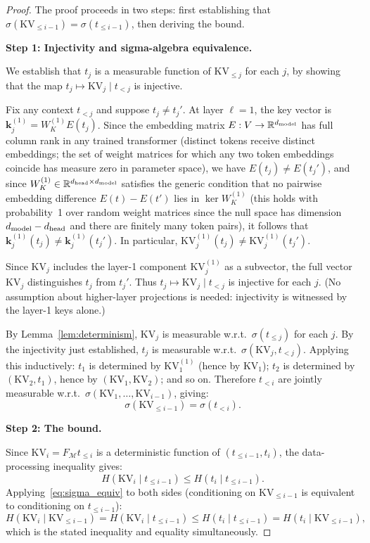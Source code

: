 \documentclass[11pt]{article}
\begin{document}
\begin{proof}
The proof proceeds in two steps: first establishing that $\sigma(\mathrm{KV}_{\leq i-1}) = \sigma(t_{\leq i-1})$, then deriving the bound.

\textbf{Step 1: Injectivity and sigma-algebra equivalence.}

We establish that $t_j$ is a measurable function of $\mathrm{KV}_{\leq j}$ for
each $j$, by showing that the map $t_j \mapsto \mathrm{KV}_j \mid t_{<j}$ is
injective.

Fix any context $t_{<j}$ and suppose $t_j \neq t_j'$.  At layer $\ell = 1$,
the key vector is $\mathbf{k}^{(1)}_j = W_K^{(1)} E(t_j)$.  Since the
embedding matrix $E: V \to \mathbb{R}^{d_{\rm model}}$ has full column rank
in any trained transformer (distinct tokens receive distinct embeddings; the
set of weight matrices for which any two token embeddings coincide has measure
zero in parameter space), we have $E(t_j) \neq E(t_j')$, and since
$W_K^{(1)} \in \mathbb{R}^{d_{\rm head} \times d_{\rm model}}$ satisfies the generic condition that no pairwise embedding difference $E(t) - E(t')$ lies in $\ker W_K^{(1)}$ (this holds with probability~1 over random weight matrices since the null space has dimension $d_{\rm model} - d_{\rm head}$ and there are finitely many token pairs), it follows that
$\mathbf{k}^{(1)}_j(t_j) \neq \mathbf{k}^{(1)}_j(t_j')$.  In particular,
$\mathrm{KV}_j^{(1)}(t_j) \neq \mathrm{KV}_j^{(1)}(t_j')$.

Since $\mathrm{KV}_j$ includes the layer-1 component $\mathrm{KV}_j^{(1)}$
as a subvector, the full vector $\mathrm{KV}_j$ distinguishes $t_j$ from $t_j'$.
Thus $t_j \mapsto \mathrm{KV}_j \mid t_{<j}$ is injective for each $j$.
(No assumption about higher-layer projections is needed: injectivity is
witnessed by the layer-1 keys alone.)

By Lemma~\ref{lem:determinism}, $\mathrm{KV}_j$ is measurable w.r.t.\ $\sigma(t_{\leq j})$
for each $j$.  By the injectivity just established, $t_j$ is measurable w.r.t.\
$\sigma(\mathrm{KV}_j, t_{<j})$.  Applying this inductively:
$t_1$ is determined by $\mathrm{KV}_1^{(1)}$ (hence by $\mathrm{KV}_1$);
$t_2$ is determined by $(\mathrm{KV}_2, t_1)$, hence by $(\mathrm{KV}_1, \mathrm{KV}_2)$;
and so on.
Therefore $t_{<i}$ are jointly measurable w.r.t.\
$\sigma(\mathrm{KV}_1,\ldots,\mathrm{KV}_{i-1})$, giving:
\begin{equation}
  \sigma(\mathrm{KV}_{\leq i-1}) = \sigma(t_{<i}).
  \label{eq:sigma_equiv}
\end{equation}

\textbf{Step 2: The bound.}

Since $\mathrm{KV}_i = F_{\mathcal{M}}t_{\leq i}$ is a deterministic function
of $(t_{\leq i-1}, t_i)$, the data-processing inequality gives:
\[
  H(\mathrm{KV}_i \mid t_{\leq i-1}) \leq H(t_i \mid t_{\leq i-1}).
\]
Applying~\eqref{eq:sigma_equiv} to both sides (conditioning on $\mathrm{KV}_{\leq i-1}$
is equivalent to conditioning on $t_{\leq i-1}$):
\[
  H(\mathrm{KV}_i \mid \mathrm{KV}_{\leq i-1})
  = H(\mathrm{KV}_i \mid t_{\leq i-1})
  \leq H(t_i \mid t_{\leq i-1})
  = H(t_i \mid \mathrm{KV}_{\leq i-1}),
\]
which is the stated inequality and equality simultaneously.
\end{proof}
\end{document}

